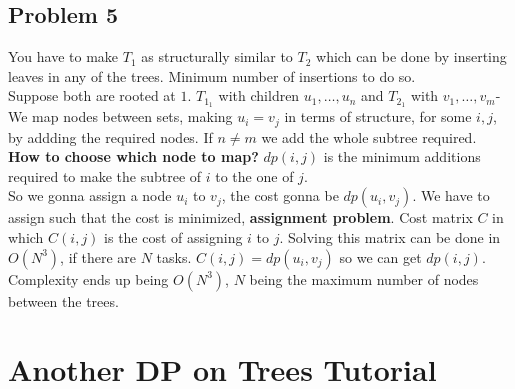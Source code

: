 \documentclass{IEEEtran}
\begin{document}
        \subsection{Problem 5}
            You have to make $T_1$ as structurally similar to $T_2$ which can be done by inserting leaves in any of the trees. Minimum number of insertions to do so.\\
            Suppose both are rooted at $1$. $T_{1_1}$ with children $u_1,\ldots,u_n$ and $T_{2_1}$ with $v_1,\ldots,v_m$- We map nodes between sets, making $u_i = v_j$ in terms of structure, for some $i,j$, by addding the required nodes. If $n\neq m$ we add the whole subtree required.\\
            \textbf{How to choose which node to map?} $dp(i,j)$ is the minimum additions required to make the subtree of $i$ to the one of $j$.\\
            So we gonna assign a node $u_i$ to $v_j$, the cost gonna be $dp(u_i,v_j)$. We have to assign such that the cost is minimized, \textbf{assignment problem}. Cost matrix $C$ in which $C(i,j)$ is the cost of assigning $i$ to $j$. Solving this matrix can be done in $O(N^3)$, if there are $N$ tasks. $C(i,j) = dp(u_i,v_j)$ so we can get $dp(i,j)$.\\
            Complexity ends up being $O(N^3)$, $N$ being the maximum number of nodes between the trees.
        
    \section{Another DP on Trees Tutorial}
\end{document}
